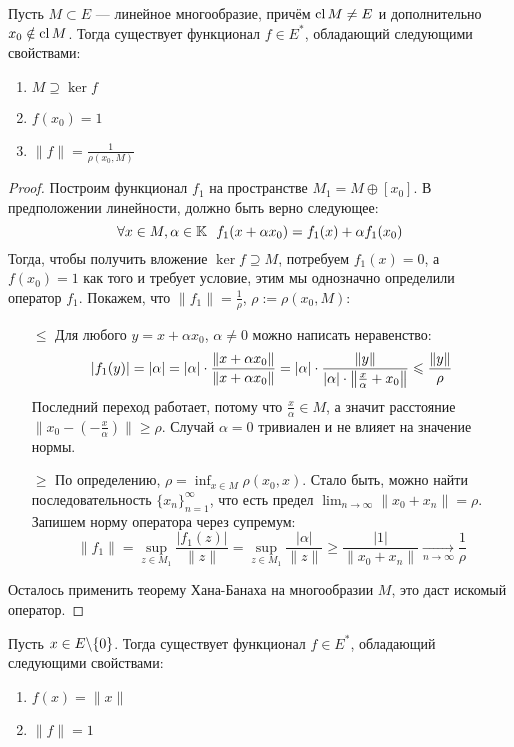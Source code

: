 \begin{corollary}
	Пусть $M \subset E$ --- линейное многообразие, причём $\operatorname{cl} M \neq E$ и дополнительно $x_0 \notin \operatorname{cl} M$. Тогда существует функционал $f \in E^*$, обладающий следующими свойствами:
	\begin{enumerate}
		\item $M \supseteq \ker f$
		
		\item $f(x_0) = 1$
		
		\item $\|f\| = \frac{1}{\rho(x_0, M)}$
	\end{enumerate}
\end{corollary}

\begin{proof}
	Построим функционал $f_1$ на пространстве $M_1 = M \oplus [x_0]$. В предположении линейности, должно быть верно следующее:
	\[
		\forall x \in M, \alpha \in \mathbb{K}\ \ f_1(x + \alpha x_0) = f_1(x) + \alpha f_1(x_0)
	\]
	Тогда, чтобы получить вложение $\ker f \supseteq M$, потребуем $f_1(x) = 0$, а $f(x_0) = 1$ как того и требует условие, этим мы однозначно определили оператор $f_1$. Покажем, что $\|f_1\| = \frac{1}{\rho}$, $\rho := \rho(x_0, M)$:
	\begin{itemize}
		\item[$\le$] Для любого $y = x + \alpha x_0$, $\alpha \neq 0$ можно написать неравенство:
		\[
			|f_1(y)| = |\alpha| = |\alpha| \cdot \frac{\|x + \alpha x_0\|}{\|x + \alpha x_0\|} = |\alpha| \cdot \frac{\|y\|}{|\alpha| \cdot \left\|\frac{x}{\alpha} + x_0\right\|} \leqslant \frac{\|y\|}{\rho}
		\]
		Последний переход работает, потому что $\frac{x}{\alpha} \in M$, а значит расстояние $\|x_0 - (-\frac{x}{\alpha})\| \ge \rho$. Случай $\alpha = 0$ тривиален и не влияет на значение нормы.
		
		\item[$\ge$] По определению, $\rho = \inf_{x \in M} \rho(x_0, x)$. Стало быть, можно найти последовательность $\{x_n\}_{n = 1}^\infty$, что есть предел $\lim_{n \to \infty} \|x_0 + x_n\| = \rho$. Запишем норму оператора через супремум:
		\[
			\|f_1\| = \sup_{z \in M_1} \frac{|f_1(z)|}{\|z\|} = \sup_{z \in M_1} \frac{|\alpha|}{\|z\|} \ge \frac{|1|}{\|x_0 + x_n\|} \xrightarrow[n \to \infty]{} \frac{1}{\rho}
		\]
	\end{itemize}
	Осталось применить теорему Хана-Банаха на многообразии $M$, это даст искомый оператор.
\end{proof}

\begin{corollary}
	Пусть $x \in E \backslash \{0\}$. Тогда существует функционал $f \in E^*$, обладающий следующими свойствами:
	\begin{enumerate}
		\item $f(x) = \|x\|$
		
		\item $\|f\| = 1$
	\end{enumerate}
\end{corollary}

